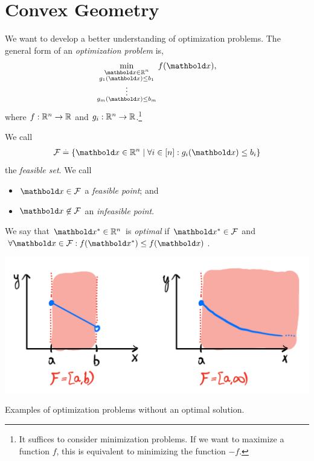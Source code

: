 
\chapter{Convex Geometry}

We want to develop a better understanding of optimization problems. The general form of an \emph{optimization problem} is, \begin{align}
    \min_{\substack{\vx \in \R^n \\ g_1(\vx) \leq b_1 \\ \vdots \\ g_m(\vx) \leq b_m}} f(\vx), \label{eq:optimization_problem}
\end{align} where $f : \mathbb{R}^n \to \mathbb{R}$ and $g_i : \mathbb{R}^n \to \mathbb{R}$.\footnote{It suffices to consider minimization problems. If we want to maximize a function $f$, this is equivalent to minimizing the function $-f$.}

\begin{defn} We call \begin{align}
    \spa{F} \defeq \{\vx \in \R^n \mid \forall i \in [n]: g_i(\vx) \leq b_i\}
\end{align} the \emph{feasible set}. We call \begin{itemize}
    \item $\vx \in \spa{F}$ a \emph{feasible point}; and
    \item $\vx \not\in \spa{F}$ an \emph{infeasible point}.
\end{itemize}
\end{defn}
\begin{defn} We say that $\s{\vx} \in \R^n$ is \emph{optimal} if $\s{\vx} \in \spa{F}$ and $\forall \vx \in \spa{F}: f(\s{\vx}) \leq f(\vx)$.
\end{defn}
\begin{marginfigure}
\includegraphics[width=\textwidth]{notes/figures/no_opt.png}
\caption{Examples of optimization problems without an optimal solution.}
\end{marginfigure}


